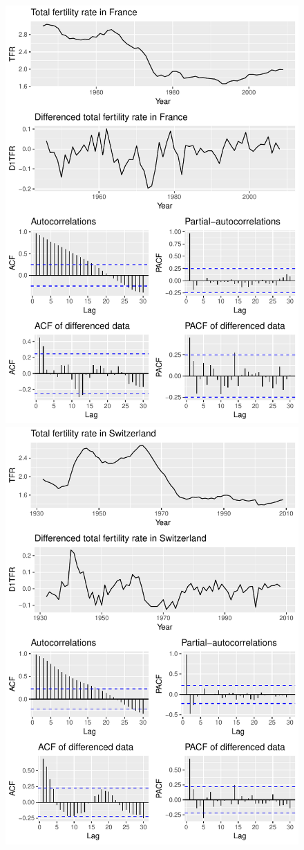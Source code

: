 \documentclass[a4paper, 12pt]{scrartcl}
\begin{document}
\begin{figure}[h!]
	\centering
	\includegraphics[height=0.85\textwidth, angle=-90]{ACFrance}
	\includegraphics[height=0.85\textwidth, angle=-90]{ACSwitzerland}
\end{figure}
\end{document}
